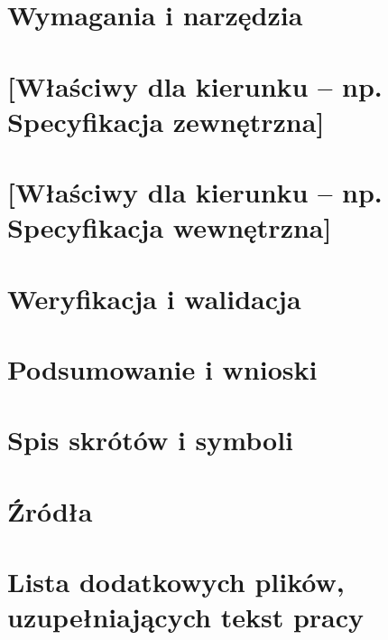 \chapter{Wymagania i narzędzia}


\chapter{[Właściwy dla kierunku -- np. Specyfikacja zewnętrzna]}



\chapter{[Właściwy dla kierunku -- np. Specyfikacja wewnętrzna]}


\chapter{Weryfikacja i walidacja}


\chapter{Podsumowanie i wnioski}



\backmatter
\printbibliography           %

\begin{appendices}

\chapter{Spis skrótów i symboli}


\chapter{Źródła}


\chapter{Lista dodatkowych plików, uzupełniających tekst pracy} 


\end{appendices}




